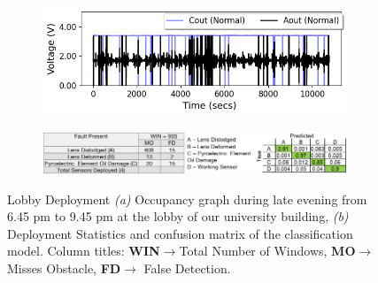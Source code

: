 \documentclass[manuscript,screen,review]{acmart} %
\newcommand{\ca}{{\it (a) }}
\newcommand{\cb}{{\it (b) }}
\providecommand{\DIFaddbeginFL}{} %
\providecommand{\DIFaddendFL}{} %
\providecommand{\DIFdelbeginFL}{} %
\providecommand{\DIFdelendFL}{} %
\newcommand{\DIFscaledelfig}{0.5}
\newlength{\DIFdelgraphicswidth} %
\newlength{\DIFdelgraphicsheight} %
\newcommand{\DIFaddincludegraphics}[2][]{{\color{blue}\fbox{\DIFOincludegraphics[#1]{#2}}}} %
\newcommand{\DIFdelincludegraphics}[2][]{%
\sbox{\DIFdelgraphicsbox}{\DIFOincludegraphics[#1]{#2}}%
\settoboxwidth{\DIFdelgraphicswidth}{\DIFdelgraphicsbox} %
\settoboxtotalheight{\DIFdelgraphicsheight}{\DIFdelgraphicsbox} %
\scalebox{\DIFscaledelfig}{%
\parbox[b]{\DIFdelgraphicswidth}{\usebox{\DIFdelgraphicsbox}\\[-\baselineskip] \rule{\DIFdelgraphicswidth}{0em}}\llap{\resizebox{\DIFdelgraphicswidth}{\DIFdelgraphicsheight}{%
\setlength{\unitlength}{\DIFdelgraphicswidth}%
\begin{picture}(1,1)%
\thicklines\linethickness{2pt} %
{\color[rgb]{1,0,0}\put(0,0){\framebox(1,1){}}}%
{\color[rgb]{1,0,0}\put(0,0){\line( 1,1){1}}}%
{\color[rgb]{1,0,0}\put(0,1){\line(1,-1){1}}}%
\end{picture}%
}\hspace*{3pt}}} %
} %
\DeclareRobustCommand{\DIFaddbeginFL}{\DIFOaddbeginFL \let\includegraphics\DIFaddincludegraphics} %
\DeclareRobustCommand{\DIFaddendFL}{\DIFOaddendFL \let\includegraphics\DIFOincludegraphics} %
\DeclareRobustCommand{\DIFdelbeginFL}{\DIFOdelbeginFL \let\includegraphics\DIFdelincludegraphics} %
\DeclareRobustCommand{\DIFdelendFL}{\DIFOaddendFL \let\includegraphics\DIFOincludegraphics} %
\begin{document}
\begin{figure}
	\centering
	\DIFdelbeginFL %
\DIFdelendFL \DIFaddbeginFL \begin{subfigure}[t]{0.4\textwidth}
		\DIFaddendFL \centering
		\DIFdelbeginFL %
\DIFdelendFL \DIFaddbeginFL \includegraphics[width=\textwidth]{figures/deployment/lobby/lateafternoon-3hrs.png}
		\DIFaddendFL \caption{}
        \label{fig:deployment_csl_lobby}\end{subfigure}\hfill \DIFdelbeginFL %
\DIFdelendFL \DIFaddbeginFL \begin{subfigure}[b]{0.59\textwidth}
	    \DIFaddendFL \centering
	    \DIFdelbeginFL %
\DIFdelendFL \DIFaddbeginFL \includegraphics[width=\textwidth]{figures/deployment/lobby/confusion-matrix-lobby-camera-ready.png}
\DIFaddendFL \caption{}
	    \label{fig:lobby_classification_results}
	\end{subfigure}
\DIFdelbeginFL %
\DIFdelendFL \caption{\footnotesize Lobby Deployment \ca Occupancy graph during late evening from 6.45 pm to 9.45 pm at the lobby of our university building, \cb Deployment Statistics and confusion matrix of the classification model. Column titles: \textbf{WIN}$\rightarrow$Total Number of Windows, \textbf{MO}$\rightarrow$Misses Obstacle, \textbf{FD}$\rightarrow$ False Detection.} 
\DIFdelbeginFL %
\DIFdelendFL \end{figure}
\end{document}
